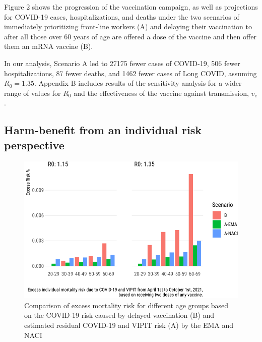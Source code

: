 \documentclass[]{interact}
\theoremstyle{plain}%
\theoremstyle{definition}
\theoremstyle{remark}
\begin{document}
Figure 2 shows the progression of the vaccination campaign, as well as
projections for COVID-19 cases, hospitalizations, and deaths under the
two scenarios of immediately prioritizing front-line workers (A) and
delaying their vaccination to after all those over 60 years of age are
offered a dose of the vaccine and then offer them an mRNA vaccine (B).

In our analysis, Scenario A led to 27175 fewer cases of COVID-19, 506
fewer hospitalizations, 87 fewer deaths, and 1462 fewer cases of Long
COVID, assuming \(R_0=1.35\). Appendix B includes results of the
sensitivity analysis for a wider range of values for \(R_0\) and the
effectiveness of the vaccine against transmission, \(v_e\).

\hypertarget{harm-benefit-from-an-individual-risk-perspective}{%
\subsection{Harm-benefit from an individual risk
perspective}\label{harm-benefit-from-an-individual-risk-perspective}}

\begin{figure}

{\centering \includegraphics[width=0.9\linewidth]{theCaseforAZ_files/figure-latex/covidvsvipit-1} 

}

\caption{ Comparison of excess mortality risk for different age groups based on the COVID-19 risk caused by delayed vaccination (B) and estimated residual COVID-19 and VIPIT risk (A) by the EMA and NACI}\label{fig:covidvsvipit}
\end{figure}
\end{document}
